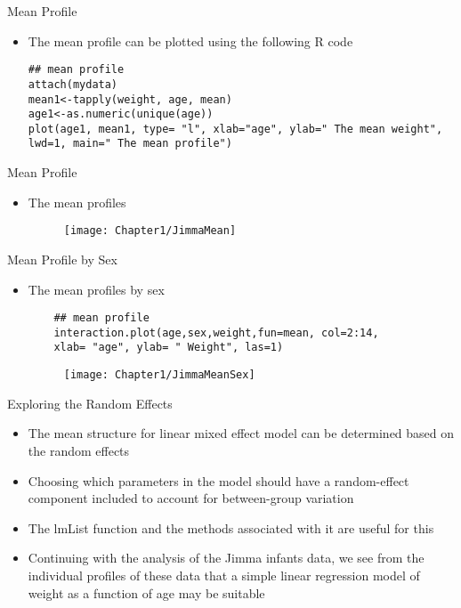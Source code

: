 \documentclass{beamer}
\begin{document}
\begin{frame}[fragile]{Mean Profile}
\begin{itemize}
	\item The mean profile can be plotted using the following R code
\begin{verbatim}	
## mean profile 
attach(mydata)
mean1<-tapply(weight, age, mean)
age1<-as.numeric(unique(age))
plot(age1, mean1, type= "l", xlab="age", ylab=" The mean weight", 
lwd=1, main=" The mean profile")
\end{verbatim}
\end{itemize}
\end{frame}


\begin{frame}{Mean Profile}
\begin{itemize}
	\item The mean profiles 
	\begin{figure}[h!]
		\centering
		\texttt{[image: Chapter1/JimmaMean]}
	\end{figure}
\end{itemize}
\end{frame}

\begin{frame}[fragile]{Mean Profile by Sex}
\begin{itemize}
	\item The mean profiles by sex
	\begin{verbatim}	
	## mean profile 
	interaction.plot(age,sex,weight,fun=mean, col=2:14, 
	xlab= "age", ylab= " Weight", las=1)
	\end{verbatim}
	\begin{figure}[h!]
		\centering
		\texttt{[image: Chapter1/JimmaMeanSex]}
	\end{figure}
\end{itemize}
\end{frame}

\begin{frame}{Exploring the Random Effects}
\begin{itemize}
\item The mean structure for linear mixed effect model can be determined based on the random effects
\item Choosing which parameters in the model should have a random-effect component included to account for between-group variation 
\item The lmList function and the methods associated with it are useful for this
\item Continuing with the analysis of the Jimma infants data, we see from the individual profiles of these data that a simple linear regression model of weight as a function of age may be suitable

\end{itemize}
\end{frame}
\end{document}
